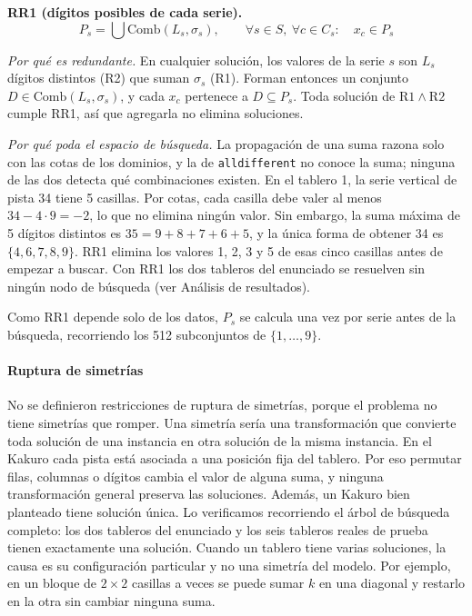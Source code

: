 \textbf{RR1 (dígitos posibles de cada serie).}
\[
    P_s = \bigcup \mathrm{Comb}(L_s, \sigma_s), \qquad \forall s \in S,\ \forall c \in C_s:\quad x_c \in P_s
\]

\textit{Por qué es redundante.} En cualquier solución, los valores de la serie $s$ son $L_s$ dígitos distintos (R2) que suman $\sigma_s$ (R1). Forman entonces un conjunto $D \in \mathrm{Comb}(L_s, \sigma_s)$, y cada $x_c$ pertenece a $D \subseteq P_s$. Toda solución de $\mathrm{R1} \land \mathrm{R2}$ cumple RR1, así que agregarla no elimina soluciones.

\textit{Por qué poda el espacio de búsqueda.} La propagación de una suma razona solo con las cotas de los dominios, y la de \texttt{alldifferent} no conoce la suma; ninguna de las dos detecta qué combinaciones existen. En el tablero 1, la serie vertical de pista 34 tiene 5 casillas. Por cotas, cada casilla debe valer al menos $34 - 4 \cdot 9 = -2$, lo que no elimina ningún valor. Sin embargo, la suma máxima de 5 dígitos distintos es $35 = 9 + 8 + 7 + 6 + 5$, y la única forma de obtener 34 es $\{4, 6, 7, 8, 9\}$. RR1 elimina los valores 1, 2, 3 y 5 de esas cinco casillas antes de empezar a buscar. Con RR1 los dos tableros del enunciado se resuelven sin ningún nodo de búsqueda (ver Análisis de resultados).

Como RR1 depende solo de los datos, $P_s$ se calcula una vez por serie antes de la búsqueda, recorriendo los 512 subconjuntos de $\{1, \dots, 9\}$.

\paragraph{Ruptura de simetrías}

No se definieron restricciones de ruptura de simetrías, porque el problema no tiene simetrías que romper. Una simetría sería una transformación que convierte toda solución de una instancia en otra solución de la misma instancia. En el Kakuro cada pista está asociada a una posición fija del tablero. Por eso permutar filas, columnas o dígitos cambia el valor de alguna suma, y ninguna transformación general preserva las soluciones. Además, un Kakuro bien planteado tiene solución única. Lo verificamos recorriendo el árbol de búsqueda completo: los dos tableros del enunciado y los seis tableros reales de prueba tienen exactamente una solución. Cuando un tablero tiene varias soluciones, la causa es su configuración particular y no una simetría del modelo. Por ejemplo, en un bloque de $2 \times 2$ casillas a veces se puede sumar $k$ en una diagonal y restarlo en la otra sin cambiar ninguna suma.

